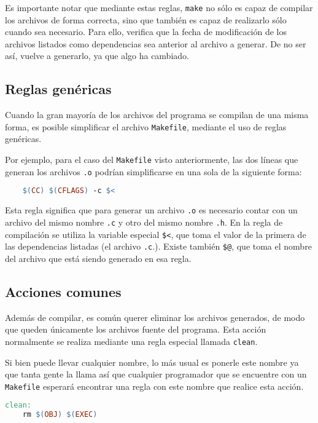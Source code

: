 Es importante notar que mediante estas reglas, \verb!make! no sólo es capaz de
compilar los archivos de forma correcta, sino que también es capaz de
realizarlo sólo cuando sea necesario.  Para ello, verifica que la fecha de
modificación de los archivos listados como dependencias sea anterior al
archivo a generar.  De no ser así, vuelve a generarlo, ya que algo ha
cambiado.

\subsection{Reglas genéricas}

Cuando la gran mayoría de los archivos del programa se compilan de una misma
forma, es posible simplificar el archivo \verb!Makefile!, mediante el uso de reglas
genéricas.

Por ejemplo, para el caso del \verb!Makefile! visto anteriormente, las dos
líneas que generan los archivos \verb!.o! podrían simplificarse en una sola de
la siguiente forma:

\begin{lstlisting}[language=make, numbers=none]
%.o: %.c %.h
	$(CC) $(CFLAGS) -c $<
\end{lstlisting}

Esta regla significa que para generar un archivo \verb!.o! es necesario contar
con un archivo del mismo nombre \verb!.c! y otro del mismo nombre \verb!.h!.
En la regla de compilación se utiliza la variable especial \lstinline!$<!, que
toma el valor de la primera de las dependencias listadas (el archivo
\verb!.c!.).  Existe también \lstinline!$@!, que toma el nombre del archivo
que está siendo generado en esa regla.

\subsection{Acciones comunes}

Además de compilar, es común querer eliminar los archivos generados, de modo
que queden únicamente los archivos fuente del programa.  Esta acción
normalmente se realiza mediante una regla especial llamada \lstinline!clean!.

Si bien puede llevar cualquier nombre, lo más usual es ponerle este nombre ya
que tanta gente la llama así que cualquier programador que se encuentre con un
\verb!Makefile! esperará encontrar una regla con este nombre que realice esta
acción.

\begin{lstlisting}[language=make, numbers=none]
clean:
	rm $(OBJ) $(EXEC)
\end{lstlisting}


